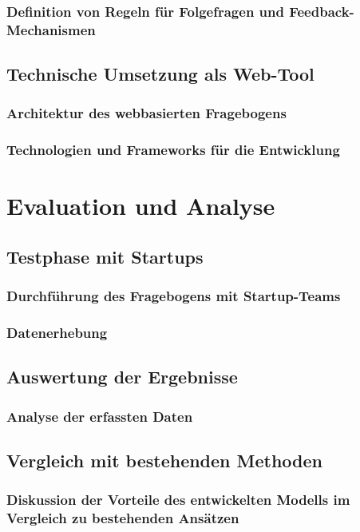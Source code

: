 \subsection{Definition von Regeln für Folgefragen und Feedback-Mechanismen}

\section{Technische Umsetzung als Web-Tool}
\subsection{Architektur des webbasierten Fragebogens}
\subsection{Technologien und Frameworks für die Entwicklung}

\chapter{Evaluation und Analyse}

\section{Testphase mit Startups}
\subsection{Durchführung des Fragebogens mit Startup-Teams}
\subsection{Datenerhebung}

\section{Auswertung der Ergebnisse}
\subsection{Analyse der erfassten Daten}

\section{Vergleich mit bestehenden Methoden}
\subsection{Diskussion der Vorteile des entwickelten Modells im Vergleich zu bestehenden Ansätzen}

